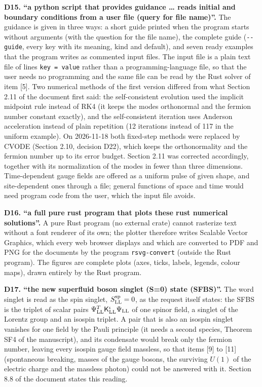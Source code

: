 \documentclass[
  10pt,
]{article}
\begin{document}
\textbf{D15. ``a python script that provides guidance \ldots{} reads
initial and boundary conditions from a user file (query for file
name)''.} The guidance is given in three ways: a short guide printed
when the program starts without arguments (with the question for the
file name), the complete guide (\texttt{-\/-guide}, every key with its
meaning, kind and default), and seven ready examples that the program
writes as commented input files. The input file is a plain text file of
lines \texttt{key\ =\ value} rather than a programming-language file, so
that the user needs no programming and the same file can be read by the
Rust solver of item {[}5{]}. Two numerical methods of the first version
differed from what Section 2.11 of the document first said: the
self-consistent evolution used the implicit midpoint rule instead of RK4
(it keeps the modes orthonormal and the fermion number constant
exactly), and the self-consistent iteration uses Anderson acceleration
instead of plain repetition (12 iterations instead of 117 in the uniform
example). On 2026-11-18 both fixed-step methods were replaced by CVODE
(Section 2.10, decision D22), which keeps the orthonormality and the
fermion number up to its error budget. Section 2.11 was corrected
accordingly, together with its normalization of the modes in fewer than
three dimensions. Time-dependent gauge fields are offered as a uniform
pulse of given shape, and site-dependent ones through a file; general
functions of space and time would need program code from the user, which
the input file avoids.

\textbf{D16. ``a full pure rust program that plots these rust numerical
solutions''.} A pure Rust program (no external crate) cannot rasterize
text without a font renderer of its own; the plotter therefore writes
Scalable Vector Graphics, which every web browser displays and which are
converted to PDF and PNG for the documents by the program
\texttt{rsvg-convert} (outside the Rust program). The figures are
complete plots (axes, ticks, labels, legends, colour maps), drawn
entirely by the Rust program.

\textbf{D17. ``the new superfluid boson singlet (S=0) state (SFBS)''.}
The word singlet is read as the spin singlet, \(S^{\rm sp}_{\rm LL}=0\),
as the request itself states: the SFBS is the triplet of scalar pairs
\(\Psi^T_{\rm LL}\mathsf K^\iota_{\rm LL}\Psi_{\rm LL}\) of one spinor
field, a singlet of the Lorentz group and an isospin triplet. A pair
that is also an isospin singlet vanishes for one field by the Pauli
principle (it needs a second species, Theorem SF4 of the manuscript),
and its condensate would break only the fermion number, leaving every
isospin gauge field massless, so that items {[}9{]} to {[}11{]}
(spontaneous breaking, masses of the gauge bosons, the surviving
\(U(1)\) of the electric charge and the massless photon) could not be
answered with it. Section 8.8 of the document states this reading.
\end{document}
